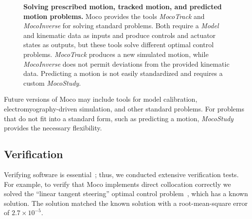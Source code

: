 \documentclass[10pt,letterpaper]{article}
\begin{document}
\begin{figure}[!h]
    \centering
    \caption{{\bf Solving prescribed motion, tracked motion, and predicted motion problems.}
        Moco provides the tools \textit{MocoTrack} and \textit{MocoInverse} for solving standard problems. Both require a \textit{Model} and kinematic data as inputs and produce controls and actuator states as outputs, but these tools solve different optimal control problems. \textit{MocoTrack} produces a new simulated motion, while \textit{MocoInverse} does not permit deviations from the provided kinematic data. Predicting a motion is not easily standardized and requires a custom \textit{MocoStudy}.
    }
    \label{mocotooldiagram}
\end{figure}

Future versions of Moco may include tools for model calibration, electromyography-driven simulation, and other standard problems. For problems that do not fit into a standard form, such as predicting a motion, \textit{MocoStudy} provides the necessary flexibility.


\subsection*{Verification}

Verifying software is essential~\cite{Hicks:2015bo}; thus, we conducted extensive verification tests. For example, to verify that Moco implements direct collocation correctly we solved the ``linear tangent steering'' optimal control problem~\cite{Bryson:1975}, which has a known solution. The solution matched the known solution with a root-mean-square error of $2.7 \times 10^{-5}$.
\end{document}
